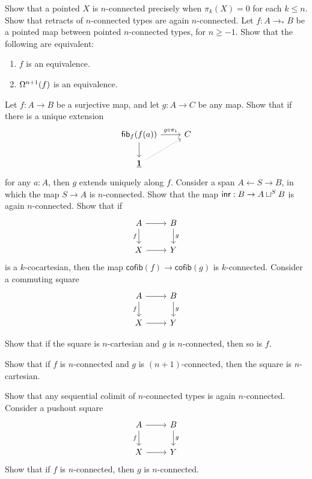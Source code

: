 \begin{exercises}
\exercise Show that a pointed $X$ is $n$-connected precisely when $\pi_k(X)=0$ for each $k\leq n$.
\exercise Show that retracts of $n$-connected types are again $n$-connected.
\exercise Let $f:A\to_\ast B$ be a pointed map between pointed $n$-connected types, for $n\geq -1$. Show that the following are equivalent:
\begin{enumerate}
\item $f$ is an equivalence.
\item $\loopspace[n+1]{f}$ is an equivalence. 
\end{enumerate}
\exercise Let $f:A\to B$ be a surjective map, and let $g:A\to C$ be any map. Show that if there is a unique extension
\begin{equation*}
\begin{tikzcd}
\fib{f}{f(a)} \arrow[r,"g\circ\pi_1"] \arrow[d] & C \\
\unit \arrow[ur,densely dotted]
\end{tikzcd}
\end{equation*}
for any $a:A$, then $g$ extends uniquely along $f$.
\exercise Consider a span $A \leftarrow S \rightarrow B$, in which the map $S\to A$ is $n$-connected. Show that the map $\inr : B\to A\sqcup^S B$ is again $n$-connected.
\exercise Show that if
\begin{equation*}
\begin{tikzcd}
A \arrow[r] \arrow[d,swap,"f"] & B \arrow[d,"g"] \\
X \arrow[r] & Y
\end{tikzcd}
\end{equation*}
is a $k$-cocartesian, then the map $\mathsf{cofib}(f)\to \mathsf{cofib}(g)$ is $k$-connected.
\exercise Consider a commuting square
\begin{equation*}
\begin{tikzcd}
A \arrow[d,swap,"f"] \arrow[r] & B \arrow[d,"g"] \\
X \arrow[r] & Y
\end{tikzcd}
\end{equation*}
\begin{subexenum}
\item Show that if the square is $n$-cartesian and $g$ is $n$-connected, then so is $f$.
\item Show that if $f$ is $n$-connected and $g$ is $(n+1)$-connected, then the square is $n$-cartesian. 
\end{subexenum}
\exercise Show that any sequential colimit of $n$-connected types is again $n$-connected.
\exercise Consider a pushout square
\begin{equation*}
\begin{tikzcd}
A \arrow[d,swap,"f"] \arrow[r] & B \arrow[d,"g"] \\
X \arrow[r] & Y
\end{tikzcd}
\end{equation*}
Show that if $f$ is $n$-connected, then $g$ is $n$-connected.
\end{exercises}
